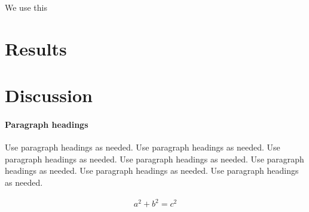 \documentclass[smallextended]{svjour3}       %
\begin{document}

We use this 



\hypertarget{sec:5}{%
\section{Results}\label{sec:results}}

\hypertarget{sec:6}{%
\section{Discussion}\label{sec:discussion}}




\hypertarget{paragraph-headings}{%
\paragraph{Paragraph headings}\label{paragraph-headings}}

Use paragraph headings as needed. 
Use paragraph headings as needed. 
Use paragraph headings as needed. 
Use paragraph headings as needed. 
Use paragraph headings as needed. 
Use paragraph headings as needed. 
Use paragraph headings as needed. 

\begin{align}
a^2+b^2=c^2
\end{align}




\end{document}
